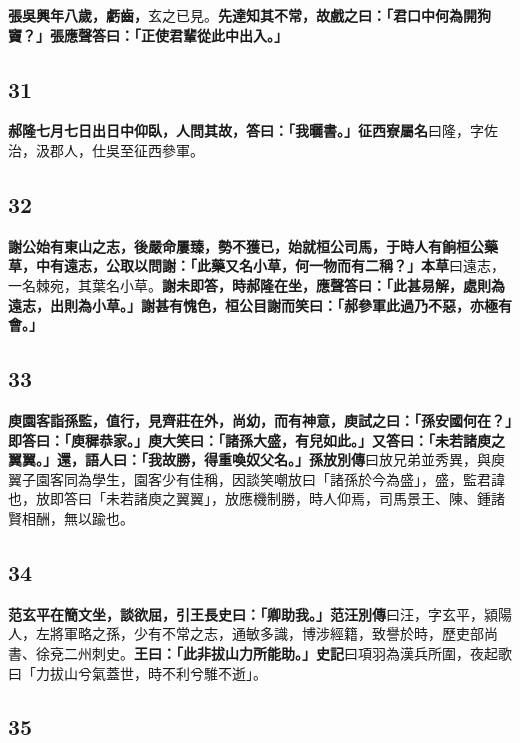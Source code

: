\textbf{張吳興年八歲，虧齒，}{\footnotesize 玄之已見。}\textbf{先達知其不常，故戲之曰：「君口中何為開狗竇？」張應聲答曰：「正使君輩從此中出入。」}

\subsection*{31}

\textbf{郝隆七月七日出日中仰臥，人問其故，答曰：「我曬書。」}{\footnotesize \textbf{征西寮屬名}曰隆，字佐治，汲郡人，仕吳至征西參軍。}

\subsection*{32}

\textbf{謝公始有東山之志，後嚴命屢臻，勢不獲已，始就桓公司馬，于時人有餉桓公藥草，中有遠志，公取以問謝：「此藥又名小草，何一物而有二稱？」}{\footnotesize \textbf{本草}曰遠志，一名棘宛，其葉名小草。}\textbf{謝未即答，時郝隆在坐，應聲答曰：「此甚易解，處則為遠志，出則為小草。」謝甚有愧色，桓公目謝而笑曰：「郝參軍此過乃不惡，亦極有會。」}

\subsection*{33}

\textbf{庾園客詣孫監，值行，見齊莊在外，尚幼，而有神意，庾試之曰：「孫安國何在？」即答曰：「庾穉恭家。」庾大笑曰：「諸孫大盛，有兒如此。」又答曰：「未若諸庾之翼翼。」還，語人曰：「我故勝，得重喚奴父名。」}{\footnotesize \textbf{孫放別傳}曰放兄弟並秀異，與庾翼子園客同為學生，園客少有佳稱，因談笑嘲放曰「諸孫於今為盛」，盛，監君諱也，放即答曰「未若諸庾之翼翼」，放應機制勝，時人仰焉，司馬景王、陳、鍾諸賢相酬，無以踰也。}

\subsection*{34}

\textbf{范玄平在簡文坐，談欲屈，引王長史曰：「卿助我。」}{\footnotesize \textbf{范汪別傳}曰汪，字玄平，潁陽人，左將軍略之孫，少有不常之志，通敏多識，博涉經籍，致譽於時，歷吏部尚書、徐兗二州刺史。}\textbf{王曰：「此非拔山力所能助。」}{\footnotesize \textbf{史記}曰項羽為漢兵所圍，夜起歌曰「力拔山兮氣蓋世，時不利兮騅不逝」。}

\subsection*{35}

